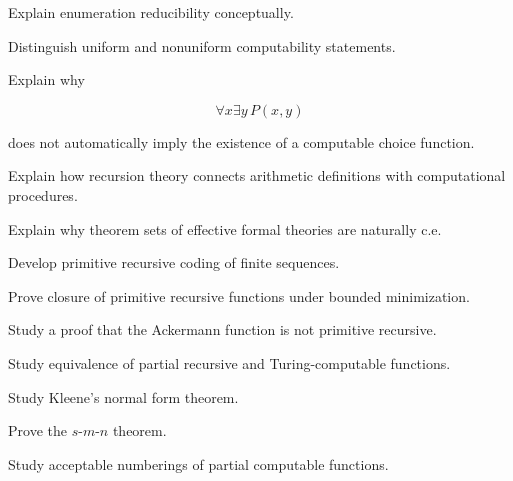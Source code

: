 \begin{exercise}[3]
Explain enumeration reducibility conceptually.
\end{exercise}

\begin{exercise}[3]
Distinguish uniform and nonuniform computability statements.
\end{exercise}

\begin{exercise}[3]
Explain why

\[
\forall x\exists y\,P(x,y)
\]

does not automatically imply the existence of a computable choice
function.
\end{exercise}

\begin{exercise}[3]
Explain how recursion theory connects arithmetic definitions with
computational procedures.
\end{exercise}

\begin{exercise}[3]
Explain why theorem sets of effective formal theories are naturally c.e.
\end{exercise}

\begin{exercise}[4]
Develop primitive recursive coding of finite sequences.
\end{exercise}

\begin{exercise}[4]
Prove closure of primitive recursive functions under bounded minimization.
\end{exercise}

\begin{exercise}[4]
Study a proof that the Ackermann function is not primitive recursive.
\end{exercise}

\begin{exercise}[4]
Study equivalence of partial recursive and Turing-computable functions.
\end{exercise}

\begin{exercise}[4]
Study Kleene's normal form theorem.
\end{exercise}

\begin{exercise}[4]
Prove the \(s\)-\(m\)-\(n\) theorem.
\end{exercise}

\begin{exercise}[4]
Study acceptable numberings of partial computable functions.
\end{exercise}

